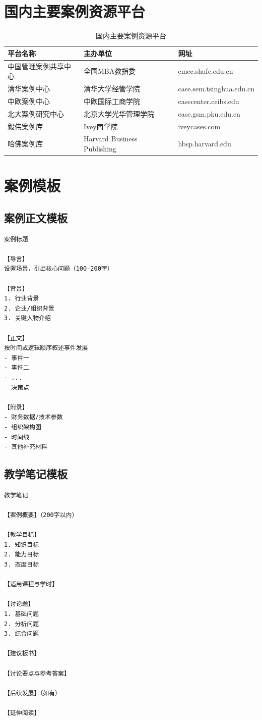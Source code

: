 \documentclass[12pt,a4paper]{ctexart}
\begin{document}
\newpage
\appendix

\section{国内主要案例资源平台}

\begin{table}[htbp]
\centering
\caption{国内主要案例资源平台}
\begin{tabular}{p{4cm}p{4cm}p{4cm}}
\toprule
\textbf{平台名称} & \textbf{主办单位} & \textbf{网址} \\
\midrule
中国管理案例共享中心 & 全国MBA教指委 & cmcc.shufe.edu.cn \\
清华案例中心 & 清华大学经管学院 & case.sem.tsinghua.edu.cn \\
中欧案例中心 & 中欧国际工商学院 & casecenter.ceibs.edu \\
北大案例研究中心 & 北京大学光华管理学院 & case.gsm.pku.edu.cn \\
毅伟案例库 & Ivey商学院 & iveycases.com \\
哈佛案例库 & Harvard Business Publishing & hbsp.harvard.edu \\
\bottomrule
\end{tabular}
\end{table}

\section{案例模板}

\subsection{案例正文模板}

\begin{verbatim}
案例标题

【导言】
设置场景，引出核心问题（100-200字）

【背景】
1. 行业背景
2. 企业/组织背景
3. 关键人物介绍

【正文】
按时间或逻辑顺序叙述事件发展
- 事件一
- 事件二
- ...
- 决策点

【附录】
- 财务数据/技术参数
- 组织架构图
- 时间线
- 其他补充材料
\end{verbatim}

\subsection{教学笔记模板}

\begin{verbatim}
教学笔记

【案例概要】（200字以内）

【教学目标】
1. 知识目标
2. 能力目标
3. 态度目标

【适用课程与学时】

【讨论题】
1. 基础问题
2. 分析问题
3. 综合问题

【建议板书】

【讨论要点与参考答案】

【后续发展】（如有）

【延伸阅读】
\end{verbatim}
\end{document}
